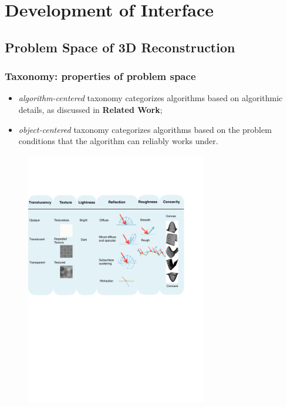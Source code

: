 \documentclass{beamer}
\begin{document}
\begin{frame}
\end{frame}

\section{Development of Interface}
\begin{frame}
\tableofcontents[currentsection,currentsubsection, 
    hideothersubsections, 
    sectionstyle=show/shaded,]
\end{frame}

\subsection{Problem Space of 3D Reconstruction}
\begin{frame}
\frametitle{Taxonomy: properties of problem space}

\begin{itemize}
\item \textit{algorithm-centered} taxonomy categorizes algorithms based on algorithmic details, as discussed in \textbf{Related Work};
\item \textit{object-centered} taxonomy categorizes algorithms based on the problem conditions that the algorithm can reliably works under.
\end{itemize}

\begin{figure}[h]
\includegraphics[width=0.7\textwidth]{taxo/obj_class}
\end{figure}

\end{frame}
\end{document}
